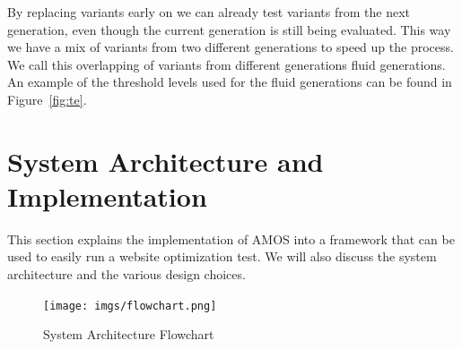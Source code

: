\documentclass{report}
\begin{document}
By replacing variants early on we can already test variants from the next generation, even though the current generation is still being evaluated. This way we have a mix of variants from two different generations to speed up the process. We call this overlapping of variants from different generations fluid generations. An example of the threshold levels used for the fluid generations can be found in Figure~\ref{fig:te}.



\chapter{System Architecture and Implementation}
This section explains the implementation of AMOS into a framework that can be used to easily run a website optimization test. We will also discuss the system architecture and the various design choices.\\

\begin{figure}[ht]
	\centering
	\texttt{[image: imgs/flowchart.png]}
	\caption{System Architecture Flowchart}
	\label{fig:flowchart}
\end{figure}
\end{document}
